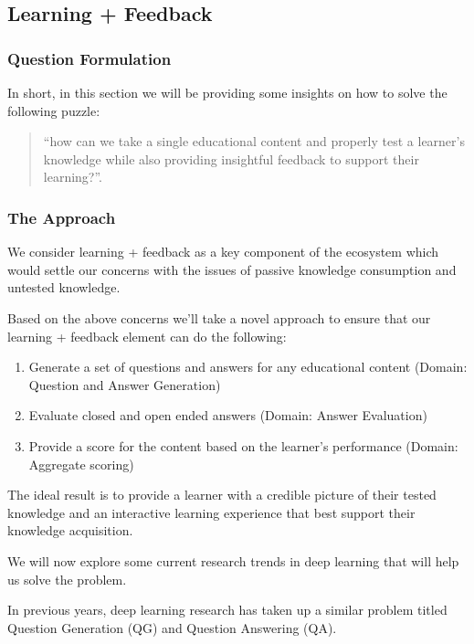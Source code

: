 \documentclass{acm_proc_article-sp}
\begin{document}
\subsection{Learning + Feedback}\label{learning-feedback}

\subsubsection{Question Formulation}\label{question-formulation}

In short, in this section we will be providing some insights on how to
solve the following puzzle:

\begin{quote}
``how can we take a single educational content and properly test a
learner's knowledge while also providing insightful feedback to support
their learning?''.
\end{quote}

\subsubsection{The Approach}\label{the-approach}

We consider learning + feedback as a key component of the ecosystem
which would settle our concerns with the issues of passive knowledge
consumption and untested knowledge.

Based on the above concerns we'll take a novel approach to ensure that
our learning + feedback element can do the following:

\begin{enumerate}
\def\labelenumi{\arabic{enumi}.}
\item
  Generate a set of questions and answers for any educational content
  (Domain: Question and Answer Generation)
\item
  Evaluate closed and open ended answers (Domain: Answer Evaluation)
\item
  Provide a score for the content based on the learner's performance
  (Domain: Aggregate scoring)
\end{enumerate}

The ideal result is to provide a learner with a credible picture of
their tested knowledge and an interactive learning experience that best
support their knowledge acquisition.

We will now explore some current research trends in deep learning that
will help us solve the problem.

In previous years, deep learning research has taken up a similar problem
titled Question Generation (QG) and Question Answering (QA).
\end{document}

